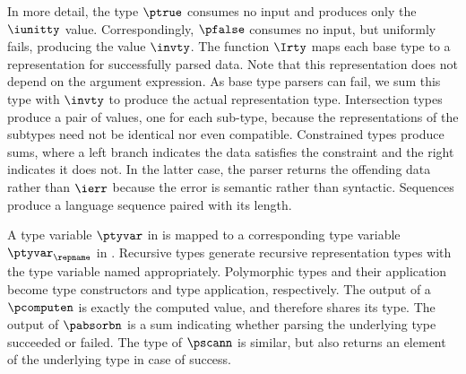 In more detail, the \ddc{} type $\ptrue$ consumes no input and
produces only the $\iunitty$ value.  Correspondingly, $\pfalse$
consumes no input, but uniformly fails, producing the value $\invty$.
The function $\Irty$ maps each base type to a representation for
successfully parsed data. Note that this representation does not
depend on the argument expression. As base type parsers can fail, we
sum this type with $\invty$ to produce the actual representation type.
Intersection types produce a pair of values, one for each sub-type,
because the representations of the subtypes need not be identical nor
even compatible.  Constrained types produce sums, where a left branch
indicates the data satisfies the constraint and the right indicates it
does not. In the latter case, the parser returns the offending data
rather than $\ierr$ because the error is semantic rather than
syntactic.  Sequences produce a \implang{} language sequence paired
with its length.  

A type variable $\ptyvar$ in \ddca{} is mapped to a
corresponding type variable $\ptyvar_\repname$ in \fomega{}.
Recursive types generate recursive representation types with the type
variable named appropriately. Polymorphic types and their application
become \fomega{} type constructors and type application, respectively.
The output of a $\pcomputen$ is exactly the computed value, and
therefore shares its type.  The output of $\pabsorbn$ is a sum
indicating whether parsing the underlying type succeeded or failed.
The type of $\pscann$ is similar, but also returns an element of the
underlying type in case of success.

